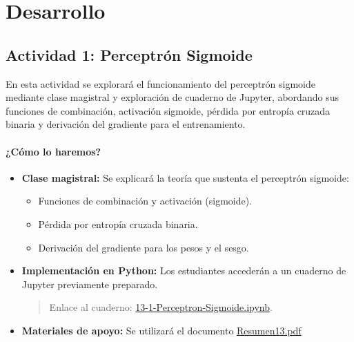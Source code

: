 \documentclass[a4,11pt]{aleph-notas}
\begin{document}
\section*{Desarrollo}

\subsection*{Actividad 1: Perceptrón Sigmoide}

En esta actividad se explorará el funcionamiento del perceptrón sigmoide mediante clase magistral y exploración de cuaderno de Jupyter, abordando sus funciones de combinación, activación sigmoide, pérdida por entropía cruzada binaria y derivación del gradiente para el entrenamiento.

\paragraph{¿Cómo lo haremos?}  
\begin{itemize}[leftmargin=*]
    \item \textbf{Clase magistral:}
    Se explicará la teoría que sustenta el perceptrón sigmoide:
    \begin{itemize}
        \item Funciones de combinación y activación (sigmoide).
        \item Pérdida por entropía cruzada binaria.
        \item Derivación del gradiente para los pesos y el sesgo.
    \end{itemize}
    
    \item \textbf{Implementación en Python:} Los estudiantes accederán a un cuaderno de Jupyter previamente preparado.
    \begin{quote}
        Enlace al cuaderno: \href{https://github.com/andres-merino/AprendizajeAutomaticoInicial-05-N0105/blob/main/2-Notebooks/13-1-Perceptron-Sigmoide.ipynb}{13-1-Perceptron-Sigmoide.ipynb}.
    \end{quote}
    
    \item \textbf{Materiales de apoyo:} 
    Se utilizará el documento \href{https://andres-merino.github.io/AprendizajeAutomaticoInicial-05-N0105/2-Resumenes/Resumen13.pdf}{Resumen13.pdf}
    
\end{itemize}
\end{document}

